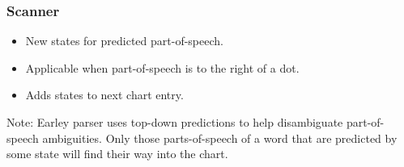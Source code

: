 
\begin{frame}[fragile]
  \frametitle{Scanner}



\begin{itemize}
  
\item New states for predicted part-of-speech.
\item Applicable when part-of-speech is to the right of a dot.
\item Adds states to next chart entry.
\end{itemize}

Note:  Earley parser uses top-down predictions to help disambiguate
part-of-speech ambiguities.  Only those parts-of-speech of a word
that are predicted by some state will find their way into the chart.

\end{frame}










